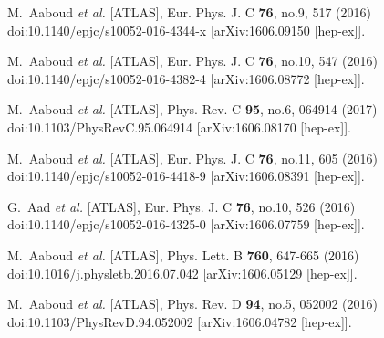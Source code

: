 \begin{thebibliography}{9}
M.~Aaboud \textit{et al.} [ATLAS],
Eur. Phys. J. C \textbf{76}, no.9, 517 (2016)
doi:10.1140/epjc/s10052-016-4344-x
[arXiv:1606.09150 [hep-ex]].

M.~Aaboud \textit{et al.} [ATLAS],
Eur. Phys. J. C \textbf{76}, no.10, 547 (2016)
doi:10.1140/epjc/s10052-016-4382-4
[arXiv:1606.08772 [hep-ex]].

M.~Aaboud \textit{et al.} [ATLAS],
Phys. Rev. C \textbf{95}, no.6, 064914 (2017)
doi:10.1103/PhysRevC.95.064914
[arXiv:1606.08170 [hep-ex]].

M.~Aaboud \textit{et al.} [ATLAS],
Eur. Phys. J. C \textbf{76}, no.11, 605 (2016)
doi:10.1140/epjc/s10052-016-4418-9
[arXiv:1606.08391 [hep-ex]].

G.~Aad \textit{et al.} [ATLAS],
Eur. Phys. J. C \textbf{76}, no.10, 526 (2016)
doi:10.1140/epjc/s10052-016-4325-0
[arXiv:1606.07759 [hep-ex]].

M.~Aaboud \textit{et al.} [ATLAS],
Phys. Lett. B \textbf{760}, 647-665 (2016)
doi:10.1016/j.physletb.2016.07.042
[arXiv:1606.05129 [hep-ex]].

M.~Aaboud \textit{et al.} [ATLAS],
Phys. Rev. D \textbf{94}, no.5, 052002 (2016)
doi:10.1103/PhysRevD.94.052002
[arXiv:1606.04782 [hep-ex]].


\end{thebibliography}
